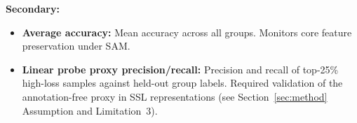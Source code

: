 \textbf{Secondary:}
\begin{itemize}
    \item \textbf{Average accuracy:} Mean accuracy across all groups. Monitors core feature preservation under SAM.
    \item \textbf{Linear probe proxy precision/recall:} Precision and recall of top-25\% high-loss samples against held-out group labels. Required validation of the annotation-free proxy in SSL representations (see Section~\ref{sec:method} Assumption and Limitation~3).
\end{itemize}
